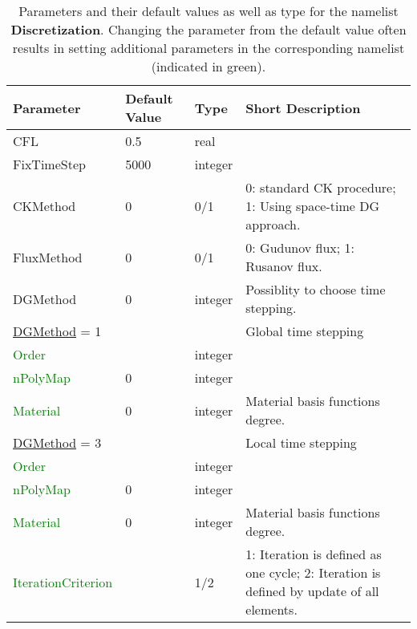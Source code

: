 \documentclass[12pt,twoside]{article}
\begin{document}
\begin{table}[H]
\caption{Parameters and their default values as well as type for the namelist \textbf{Discretization}.
         Changing the parameter from the default value often results in setting additional parameters in the corresponding namelist (indicated in green). }
\begin{center}
\begin{tabular}{|p{4cm}|p{2.7cm}|p{2cm}|p{4cm}|}
\hline
Parameter & Default Value & Type & Short Description \\
\hline
\hline
CFL & 0.5 & real & \\
FixTimeStep & 5000 & integer & \\
CKMethod & 0 & 0/1 & 0: standard CK procedure; 1: Using space-time DG approach.\\
FluxMethod & 0 & 0/1 & 0: Gudunov flux; 1: Rusanov flux.\\
DGMethod & 0 & integer & Possiblity to choose time stepping.\\
\hdashline
\uline{DGMethod} = 1 & & & Global time stepping\\
\textcolor{green}{Order} & & integer & \\
\textcolor{green}{nPolyMap} & 0 & integer & \\
\textcolor{green}{Material} & 0 & integer & Material basis functions degree.\\
\hdashline
\uline{DGMethod} = 3 & & & Local time stepping\\
\textcolor{green}{Order} & & integer & \\
\textcolor{green}{nPolyMap} & 0 & integer & \\
\textcolor{green}{Material} & 0 & integer & Material basis functions degree.\\
\textcolor{green}{IterationCriterion} & & 1/2 & 1: Iteration is defined as one cycle; 
2: Iteration is defined by update of all elements.\\
\hline
\end{tabular}
\end{center}
\label{disc-table}
\end{table}
\end{document}
